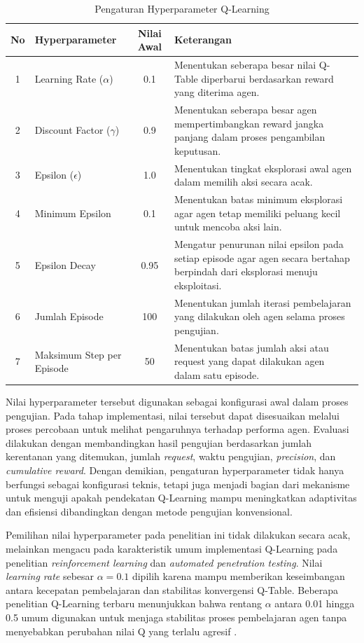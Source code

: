 \begin{table}[H]
\centering
\begin{tabular}{|c|l|c|p{7cm}|}
\hline
\textbf{No} & \textbf{Hyperparameter} & \textbf{Nilai Awal} & \textbf{Keterangan} \\ \hline

1 & Learning Rate ($\alpha$) & 0.1 & Menentukan seberapa besar nilai Q-Table diperbarui berdasarkan reward yang diterima agen. \\ \hline
2 & Discount Factor ($\gamma$) & 0.9 & Menentukan seberapa besar agen mempertimbangkan reward jangka panjang dalam proses pengambilan keputusan. \\ \hline
3 & Epsilon ($\epsilon$) & 1.0 & Menentukan tingkat eksplorasi awal agen dalam memilih aksi secara acak. \\ \hline
4 & Minimum Epsilon & 0.1 & Menentukan batas minimum eksplorasi agar agen tetap memiliki peluang kecil untuk mencoba aksi lain. \\ \hline
5 & Epsilon Decay & 0.95 & Mengatur penurunan nilai epsilon pada setiap episode agar agen secara bertahap berpindah dari eksplorasi menuju eksploitasi. \\ \hline
6 & Jumlah Episode & 100 & Menentukan jumlah iterasi pembelajaran yang dilakukan oleh agen selama proses pengujian. \\ \hline
7 & Maksimum Step per Episode & 50 & Menentukan batas jumlah aksi atau request yang dapat dilakukan agen dalam satu episode. \\ \hline

\end{tabular}
\caption{Pengaturan Hyperparameter Q-Learning}
\label{tab:hyperparameter_qlearning}
\end{table}

Nilai hyperparameter tersebut digunakan sebagai konfigurasi awal dalam proses pengujian. Pada tahap implementasi, nilai tersebut dapat disesuaikan melalui proses percobaan untuk melihat pengaruhnya terhadap performa agen. Evaluasi dilakukan dengan membandingkan hasil pengujian berdasarkan jumlah kerentanan yang ditemukan, jumlah \textit{request}, waktu pengujian, \textit{precision}, dan \textit{cumulative reward}. Dengan demikian, pengaturan hyperparameter tidak hanya berfungsi sebagai konfigurasi teknis, tetapi juga menjadi bagian dari mekanisme untuk menguji apakah pendekatan Q-Learning mampu meningkatkan adaptivitas dan efisiensi dibandingkan dengan metode pengujian konvensional.

Pemilihan nilai hyperparameter pada penelitian ini tidak dilakukan secara acak, melainkan mengacu pada karakteristik umum implementasi Q-Learning pada penelitian \textit{reinforcement learning} dan \textit{automated penetration testing}. Nilai \textit{learning rate} sebesar $\alpha = 0.1$ dipilih karena mampu memberikan keseimbangan antara kecepatan pembelajaran dan stabilitas konvergensi Q-Table. Beberapa penelitian Q-Learning terbaru menunjukkan bahwa rentang $\alpha$ antara 0.01 hingga 0.5 umum digunakan untuk menjaga stabilitas proses pembelajaran agen tanpa menyebabkan perubahan nilai Q yang terlalu agresif \cite{becker2024evaluation,sensors2025rlpentest}.

